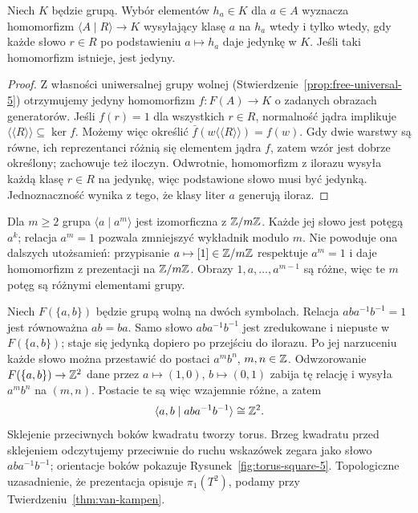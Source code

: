 \begin{stwierdzenie}
\label{prop:presentation-universal-5}
Niech $K$ będzie grupą. Wybór elementów $h_a\in K$ dla $a\in A$
wyznacza homomorfizm $\langle A\mid R\rangle\to K$ wysyłający
klasę $a$ na $h_a$ wtedy i tylko wtedy, gdy każde słowo $r\in R$
po podstawieniu $a\mapsto h_a$ daje jedynkę w $K$.
Jeśli taki homomorfizm istnieje, jest jedyny.
\end{stwierdzenie}
\begin{proof}
Z własności uniwersalnej grupy wolnej
(Stwierdzenie~\ref{prop:free-universal-5}) otrzymujemy jedyny
homomorfizm $f:F(A)\to K$ o zadanych obrazach generatorów.
Jeśli $f(r)=1$ dla wszystkich $r\in R$, normalność jądra
implikuje $\langle\!\langle R\rangle\!\rangle\subseteq\ker f$.
Możemy więc określić
$\bar f(w\langle\!\langle R\rangle\!\rangle)=f(w)$.
Gdy dwie warstwy są równe, ich reprezentanci różnią się elementem
jądra $f$, zatem wzór jest dobrze określony; zachowuje też iloczyn.
Odwrotnie, homomorfizm z ilorazu wysyła każdą klasę $r\in R$
na jedynkę, więc podstawione słowo musi być jedynką.
Jednoznaczność wynika z tego, że klasy liter $a$ generują iloraz.
\end{proof}

\begin{przyklad}
\label{prz:cyclic-presentation-5}
Dla $m\geq2$ grupa $\langle a\mid a^m\rangle$ jest izomorficzna
z $\mathbb{Z}/m\mathbb{Z}$. Każde jej słowo jest potęgą $a^k$;
relacja $a^m=1$ pozwala zmniejszyć wykładnik modulo $m$.
Nie powoduje ona dalszych utożsamień: przypisanie
$a\mapsto[1]\in\mathbb{Z}/m\mathbb{Z}$ respektuje $a^m=1$ i daje homomorfizm
z prezentacji na $\mathbb{Z}/m\mathbb{Z}$. Obrazy $1,a,\ldots,a^{m-1}$ są różne,
więc te $m$ potęg są różnymi elementami grupy.
\end{przyklad}

\begin{przyklad}
\label{prz:prezentacja-torusa-5}
Niech $F(\{a,b\})$ będzie grupą wolną
na dwóch symbolach. Relacja
$aba^{-1}b^{-1}=1$
jest równoważna $ab=ba$.
Samo słowo $aba^{-1}b^{-1}$ jest zredukowane i niepuste
w $F(\{a,b\})$; staje się jedynką dopiero po przejściu do ilorazu.
Po jej narzuceniu każde słowo
można przestawić do postaci
$a^m b^n$, $m,n\in\mathbb{Z}$.
Odwzorowanie
$F(\{a,b\})\to\mathbb{Z}^2$ dane przez
$a\mapsto(1,0)$,
$b\mapsto(0,1)$
zabija tę relację i wysyła
$a^m b^n$ na $(m,n)$.
Postacie te są więc wzajemnie
różne, a zatem
\[
 \langle a,b\mid aba^{-1}b^{-1}\rangle
 \cong\mathbb{Z}^2.
\]
Sklejenie przeciwnych boków kwadratu
tworzy torus. Brzeg kwadratu przed
sklejeniem odczytujemy przeciwnie do ruchu wskazówek zegara
jako słowo $aba^{-1}b^{-1}$; orientacje boków
pokazuje Rysunek~\ref{fig:torus-square-5}.
Topologiczne uzasadnienie, że
prezentacja opisuje $\pi_1(T^2)$,
podamy przy
Twierdzeniu~\ref{thm:van-kampen}.
\end{przyklad}

